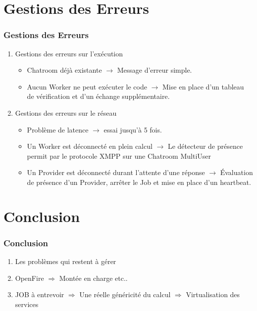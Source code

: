 \documentclass[slidetop,11pt]{beamer}
\begin{document}
\section[Gestions des Erreurs]{Gestions des Erreurs}
\begin{frame}[label=Gestions des Erreurs]
\frametitle{Gestions des Erreurs}
\begin{enumerate}
\item Gestions des erreurs sur l\textquoteright exécution
	\begin{itemize}
	\item Chatroom déjà existante $\rightarrow$ Message d'erreur simple.
	\item Aucun Worker ne peut exécuter le code $\rightarrow$ Mise en place d'un tableau de vérification et d'un échange supplémentaire. 
	\end{itemize}
\item Gestions des erreurs sur le réseau
	\begin{itemize}
	\item Problème de latence $\rightarrow$ essai jusqu’à 5 fois.
	\item Un Worker est déconnecté en plein calcul $ \rightarrow $ Le détecteur de présence permit par le protocole XMPP sur une Chatroom MultiUser
	\item Un Provider est déconnecté durant l'attente d'une réponse \newline $ \rightarrow $ Évaluation de présence d'un Provider, arrêter le Job et mise en place d'un heartbeat.
	
	\end{itemize}
\end{enumerate}

\end{frame}

\section[Conclusion]{Conclusion}
\begin{frame}[label=conclusion]
\frametitle{Conclusion}
\begin{enumerate}
\item Les problèmes qui restent à gérer
\item OpenFire $\Rightarrow$ Montée en charge etc..
\item JOB à entrevoir $\Rightarrow$ Une réelle généricité du calcul $\Rightarrow$ Virtualisation des services
\end{enumerate}
\end{frame}
\end{document}
